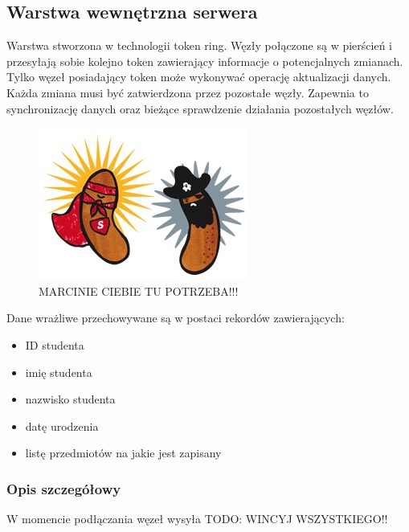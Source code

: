\subsection[Warstwa wewnętrzna serwera][Warstwa wewnętrzna serwera]{Warstwa wewnętrzna serwera}

\par{Warstwa stworzona w technologii token ring. Węzły połączone są w pierścień i przesyłają sobie kolejno token zawierający informacje o potencjalnych zmianach. Tylko węzeł posiadający token może wykonywać operację aktualizacji danych. Każda zmiana musi być zatwierdzona przez pozostałe węzły. Zapewnia to synchronizację danych oraz bieżące sprawdzenie działania pozostałych węzłów.}

\begin{figure}[h!tb]
\begin{center}
\includegraphics{img/parowa.jpg} 
\caption{MARCINIE CIEBIE TU POTRZEBA!!!}
\end{center}
\end{figure}

\par{Dane wrażliwe przechowywane są w postaci rekordów zawierających:}

\begin{itemize}
\item ID studenta
\item imię studenta
\item nazwisko studenta
\item datę urodzenia
\item listę przedmiotów na jakie jest zapisany
\end{itemize}

\subsubsection*[Opis szczegółowy]{Opis szczegółowy}


\par{W momencie podłączania węzeł wysyła TODO: WINCYJ WSZYSTKIEGO!!}

